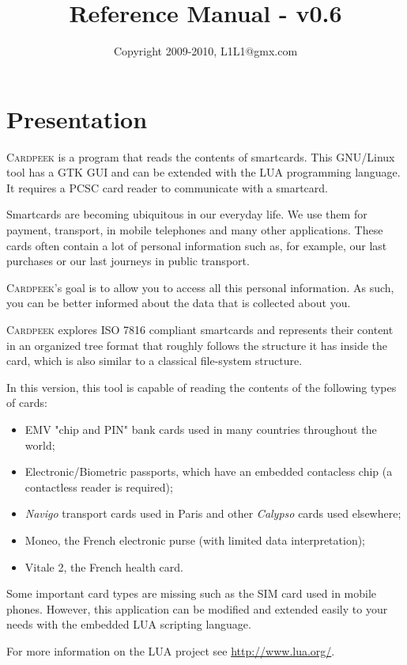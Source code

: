 \documentclass[11pt]{report}
\title{\huge{\Cardpeek{} Reference Manual - v0.6}}
\author{Copyright 2009-2010, L1L1@gmx.com}
\newcommand{\Cardpeek}{\textsc{Cardpeek}}
\begin{document}
\maketitle

\chapter*{Presentation}

\Cardpeek{} is a program that reads the contents of smartcards. 
This GNU/Linux tool has a GTK GUI and can be extended with the LUA programming language. 
It requires a PCSC card reader to communicate with a smartcard.

Smartcards are becoming ubiquitous in our everyday life. 
We use them for payment, transport, in mobile telephones and many other applications.
These cards often contain a lot of personal information such as, for example, our last purchases or 
our last journeys in public transport.

\Cardpeek's goal is to allow you to access all this personal information. As such, you 
can be better informed about the data that is collected about you.

\Cardpeek{} explores ISO 7816 compliant smartcards and represents their content in an organized 
tree format that roughly follows the structure it has inside the card, which is also similar to a 
classical file-system structure.

In this version, this tool is capable of reading the contents of the following types of cards:
\begin{itemize}
\item{EMV "chip and PIN" bank cards used in many countries throughout the world;}
\item{Electronic/Biometric passports, which have an embedded contacless chip (a contactless reader is required);}
\item{\textit{Navigo} transport cards used in Paris and other \textit{Calypso} cards used elsewhere;}
\item{Moneo, the French electronic purse (with limited data interpretation);}
\item{Vitale 2, the French health card.}
\end{itemize}

Some important card types are missing such as the SIM card used in mobile phones.
However, this application can be modified and extended easily to your needs with the embedded LUA scripting language.

For more information on the LUA project see \url{http://www.lua.org/}.
\end{document}

